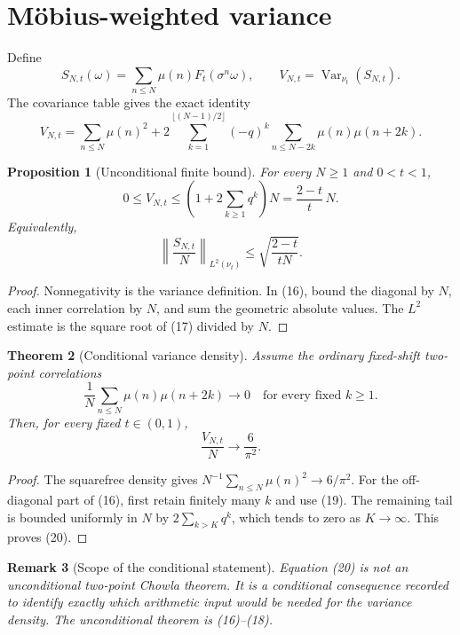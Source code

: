 \documentclass[11pt]{article}
\newtheorem{theorem}{Theorem}[section]
\newtheorem{proposition}[theorem]{Proposition}
\newtheorem{remark}[theorem]{Remark}
\newcommand{\Mob}{\mu}
\newcommand{\Var}{\operatorname{Var}}
\begin{document}
\section{Möbius-weighted variance}

Define
\[
 S_{N,t}(\omega)=\sum_{n\le N}\Mob(n)F_t(\sigma^n\omega),
 \qquad V_{N,t}=\Var_{\nu_t}(S_{N,t}). \tag{15}
\]
The covariance table gives the exact identity
\[
 V_{N,t}
 =\sum_{n\le N}\Mob(n)^2
 +2\sum_{k=1}^{\lfloor(N-1)/2\rfloor}(-q)^k
   \sum_{n\le N-2k}\Mob(n)\Mob(n+2k). \tag{16}
\]

\begin{proposition}[Unconditional finite bound]
\label{prop:bound}
For every $N\ge1$ and $0<t<1$,
\[
 0\le V_{N,t}\le \left(1+2\sum_{k\ge1}q^k\right)N
 =\frac{2-t}{t}\,N. \tag{17}
\]
Equivalently,
\[
 \left\|\frac{S_{N,t}}N\right\|_{L^2(\nu_t)}
 \le\sqrt{\frac{2-t}{tN}}. \tag{18}
\]
\end{proposition}

\begin{proof}
Nonnegativity is the variance definition.  In (16), bound the diagonal by
$N$, each inner correlation by $N$, and sum the geometric absolute values.
The $L^2$ estimate is the square root of (17) divided by $N$.
\end{proof}

\begin{theorem}[Conditional variance density]
\label{thm:conditional}
Assume the ordinary fixed-shift two-point correlations
\[
 \frac1N\sum_{n\le N}\Mob(n)\Mob(n+2k)\longrightarrow0
 \quad\text{for every fixed }k\ge1. \tag{19}
\]
Then, for every fixed $t\in(0,1)$,
\[
 \frac{V_{N,t}}N\longrightarrow\frac6{\pi^2}. \tag{20}
\]
\end{theorem}

\begin{proof}
The squarefree density gives $N^{-1}\sum_{n\le N}\Mob(n)^2\to6/\pi^2$.
For the off-diagonal part of (16), first retain finitely many $k$ and use
(19).  The remaining tail is bounded uniformly in $N$ by
$2\sum_{k>K}q^k$, which tends to zero as $K\to\infty$.  This proves (20).
\end{proof}

\begin{remark}[Scope of the conditional statement]
Equation (20) is not an unconditional two-point Chowla theorem.  It is a
conditional consequence recorded to identify exactly which arithmetic input
would be needed for the variance density.  The unconditional theorem is
(16)--(18).
\end{remark}
\end{document}
